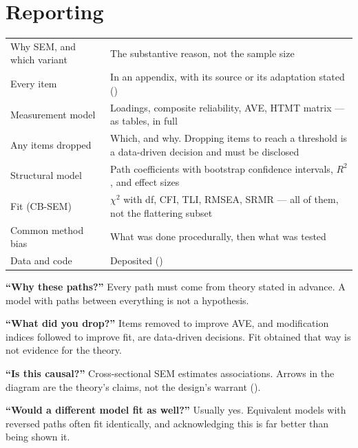 \section{Reporting}

\begin{center}
\small
\begin{tabular}{@{}L{4.0cm}L{10.3cm}@{}}
\toprule
Why SEM, and which variant & The substantive reason, not the sample size \\
Every item                 & In an appendix, with its source or its adaptation
                             stated () \\
Measurement model          & Loadings, composite reliability, AVE, HTMT matrix
                             --- as tables, in full \\
Any items dropped          & Which, and why. Dropping items to reach a
                             threshold is a data-driven decision and must be
                             disclosed \\
Structural model           & Path coefficients with bootstrap confidence
                             intervals, $R^2$, and effect sizes \\
Fit (CB-SEM)               & $\chi^2$ with df, CFI, TLI, RMSEA, SRMR --- all of
                             them, not the flattering subset \\
Common method bias         & What was done procedurally, then what was tested \\
Data and code              & Deposited () \\
\bottomrule
\end{tabular}
\end{center}

\begin{pitfall}
\begin{tight}
  \item \textbf{``Why these paths?''} Every path must come from theory stated
    in advance. A model with paths between everything is not a hypothesis.
  \item \textbf{``What did you drop?''} Items removed to improve AVE, and
    modification indices followed to improve fit, are data-driven decisions.
    Fit obtained that way is not evidence for the theory.
  \item \textbf{``Is this causal?''} Cross-sectional SEM estimates
    associations. Arrows in the diagram are the theory's claims, not the
    design's warrant ().
  \item \textbf{``Would a different model fit as well?''} Usually yes.
    Equivalent models with reversed paths often fit identically, and
    acknowledging this is far better than being shown it.
\end{tight}
\end{pitfall}

